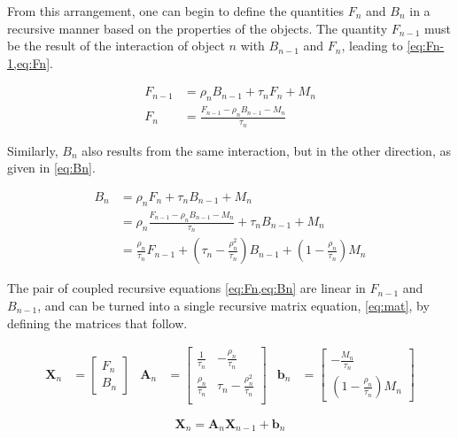 \documentclass[11pt,a4paper]{article}
\begin{document}
From this arrangement, one can begin to define the quantities $ F_n $ and $ B_n $ in a recursive manner based on the properties of the objects. The quantity $ F_{n-1} $ must be the result of the interaction of object $ n $ with $ B_{n-1} $ and $ F_{n} $, leading to \cref{eq:Fn-1,eq:Fn}.

\begin{align}
	F_{n-1} &= \rho_n B_{n-1} + \tau_n F_n + M_n \label{eq:Fn-1} \\
	F_n &= \frac{F_{n-1} - \rho_n B_{n-1} - M_n}{\tau_n}\label{eq:Fn}
\end{align}

Similarly, $ B_n $ also results from the same interaction, but in the other direction, as given in \cref{eq:Bn}.

\begin{equation}\label{eq:Bn}
	\begin{split}
		B_n &= \rho_n F_n + \tau_n B_{n-1} + M_n \\
		&= \rho_n \frac{F_{n-1} - \rho_n B_{n-1} - M_n}{\tau_n} + \tau_n B_{n-1} + M_n \\
		&= \frac{\rho_n}{\tau_n} F_{n-1} + \left(\tau_n - \frac{\rho_n^2}{\tau_n}\right) B_{n-1} + \left(1 - \frac{\rho_n}{\tau_n}\right) M_n
	\end{split}
\end{equation}

The pair of coupled recursive equations \cref{eq:Fn,eq:Bn} are linear in $ F_{n-1} $ and $ B_{n-1} $, and can be turned into a single recursive matrix equation, \cref{eq:mat}, by defining the matrices that follow.

\begin{align*}
	\bm{X}_n &=
	\begin{bmatrix}
		F_n \\ B_n
	\end{bmatrix}
	&
	\bm{A}_n &=
	\begin{bmatrix}
		\frac{1}{\tau_n} & -\frac{\rho_n}{\tau_n} \\
		\frac{\rho_n}{\tau_n} & \tau_n-\frac{\rho_n^2}{\tau_n} \\
	\end{bmatrix}
	&
	\bm{b}_n &= 
	\begin{bmatrix}
		-\frac{M_n}{\tau_n}\\[4pt]
		\left(1 - \frac{\rho_n}{\tau_n}\right) M_n
	\end{bmatrix}
\end{align*}

\begin{equation}\label{eq:mat}
	\bm{X}_{n} = \bm{A}_n \bm{X}_{n-1} + \bm{b}_n
\end{equation}
\end{document}
